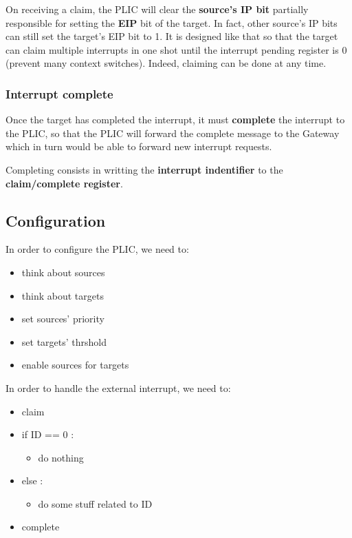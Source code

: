 \documentclass[10pt, a4paper]{article}
\begin{document}
On receiving a claim, the PLIC will clear the \textbf{source's IP bit} partially responsible for setting the \textbf{EIP} bit of the target. In fact, other source's IP bits can still set the target's EIP bit to 1. It is designed like that so that the target can claim multiple interrupts in one shot until the interrupt pending register is 0 (prevent many context switches). Indeed, claiming can be done at any time.\\

\noindent {}

\subsubsection{Interrupt complete}

Once the target has completed the interrupt, it must \textbf{complete} the interrupt to the PLIC, so that the PLIC will forward the complete message to the Gateway which in turn would be able to forward new interrupt requests.

Completing consists in writting the \textbf{interrupt indentifier} to the \textbf{claim/complete register}.\\

\noindent {}

\subsection{Configuration}

In order to configure the PLIC, we need to:

\begin{itemize}
\item think about sources
\item think about targets
\item set sources' priority
\item set targets' thrshold
\item enable sources for targets
\end{itemize}

\noindent In order to handle the external interrupt, we need to:

\begin{itemize}
\item claim
\item if ID == 0 :
	\begin{itemize}
	\item do nothing
	\end{itemize}
\item else :
	\begin{itemize}
	\item do some stuff related to ID
	\end{itemize}
\item complete
\end{itemize}
\end{document}

